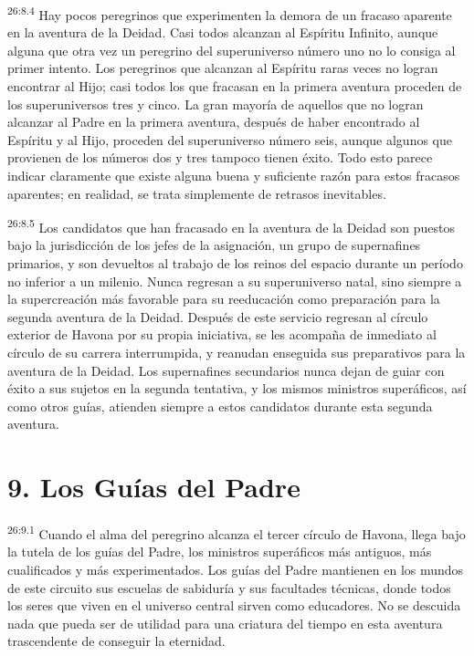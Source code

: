 \par
\textsuperscript{26:8.4} Hay pocos peregrinos que experimenten la demora de un fracaso aparente en la aventura de la Deidad. Casi todos alcanzan al Espíritu Infinito, aunque alguna que otra vez un peregrino del superuniverso número uno no lo consiga al primer intento. Los peregrinos que alcanzan al Espíritu raras veces no logran encontrar al Hijo; casi todos los que fracasan en la primera aventura proceden de los superuniversos tres y cinco. La gran mayoría de aquellos que no logran alcanzar al Padre en la primera aventura, después de haber encontrado al Espíritu y al Hijo, proceden del superuniverso número seis, aunque algunos que provienen de los números dos y tres tampoco tienen éxito. Todo esto parece indicar claramente que existe alguna buena y suficiente razón para estos fracasos aparentes; en realidad, se trata simplemente de retrasos inevitables.

\par
\textsuperscript{26:8.5} Los candidatos que han fracasado en la aventura de la Deidad son puestos bajo la jurisdicción de los jefes de la asignación, un grupo de supernafines primarios, y son devueltos al trabajo de los reinos del espacio durante un período no inferior a un milenio. Nunca regresan a su superuniverso natal, sino siempre a la supercreación más favorable para su reeducación como preparación para la segunda aventura de la Deidad. Después de este servicio regresan al círculo exterior de Havona por su propia iniciativa, se les acompaña de inmediato al círculo de su carrera interrumpida, y reanudan enseguida sus preparativos para la aventura de la Deidad. Los supernafines secundarios nunca dejan de guiar con éxito a sus sujetos en la segunda tentativa, y los mismos ministros superáficos, así como otros guías, atienden siempre a estos candidatos durante esta segunda aventura.

\section*{9. Los Guías del Padre}
\par
\textsuperscript{26:9.1} Cuando el alma del peregrino alcanza el tercer círculo de Havona, llega bajo la tutela de los guías del Padre, los ministros superáficos más antiguos, más cualificados y más experimentados. Los guías del Padre mantienen en los mundos de este circuito sus escuelas de sabiduría y sus facultades técnicas, donde todos los seres que viven en el universo central sirven como educadores. No se descuida nada que pueda ser de utilidad para una criatura del tiempo en esta aventura trascendente de conseguir la eternidad.

